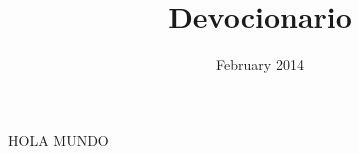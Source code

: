 \documentclass[11pt, a5paper, twoside]{book}
\title{Devocionario}
\date{February 2014}
\begin{document}
\begin{titlepage}
\maketitle    
\end{titlepage}

HOLA MUNDO
    
\end{document}
